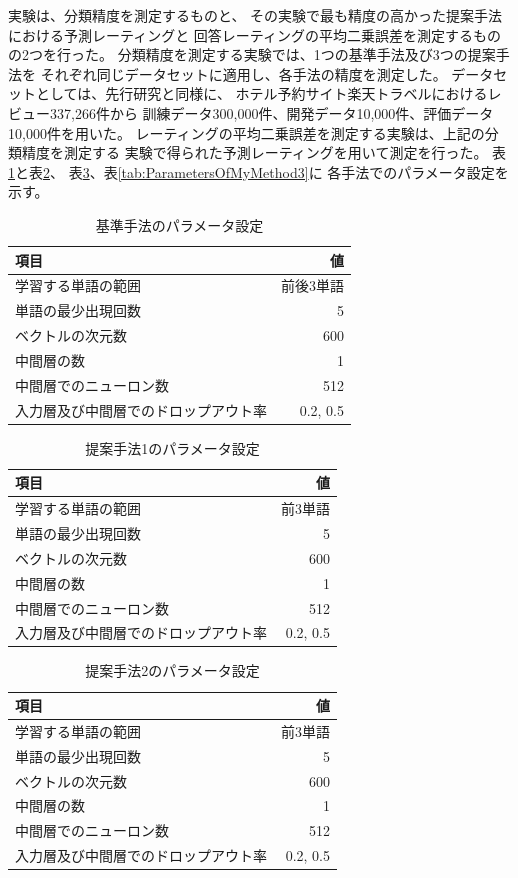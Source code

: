 \documentclass[twocolumn,a4paper]{ltjarticle}
\begin{document}
 実験は、分類精度を測定するものと、
その実験で最も精度の高かった提案手法における予測レーティングと
回答レーティングの平均二乗誤差を測定するものの2つを行った。
 分類精度を測定する実験では、1つの基準手法及び3つの提案手法を
それぞれ同じデータセットに適用し、各手法の精度を測定した。
データセットとしては、先行研究\cite{fujitani15}と同様に、
ホテル予約サイト楽天トラベルにおけるレビュー337,266件から
訓練データ300,000件、開発データ10,000件、評価データ10,000件を用いた。
 レーティングの平均二乗誤差を測定する実験は、上記の分類精度を測定する
実験で得られた予測レーティングを用いて測定を行った。
 表\ref{tab:ParametersOfBaselineMethod}と表\ref{tab:ParametersOfMyMethod1}、
表\ref{tab:ParametersOfMyMethod2}、表\ref{tab:ParametersOfMyMethod3}に
各手法でのパラメータ設定を示す。

\begin{table}
  \caption{基準手法のパラメータ設定}
  \begin{tabular}{l | r}\label{tab:ParametersOfBaselineMethod}
    項目 & 値 \\
    \hline
    学習する単語の範囲 & 前後3単語 \\
    単語の最少出現回数 & 5 \\
    ベクトルの次元数 & 600 \\
    中間層の数 & 1 \\
    中間層でのニューロン数 & 512 \\
    入力層及び中間層でのドロップアウト率 & 0.2, 0.5 \\
  \end{tabular}
\end{table}

\begin{table}
  \caption{提案手法1のパラメータ設定}
  \begin{tabular}{l | r}\label{tab:ParametersOfMyMethod1}
    項目 & 値 \\
    \hline
    学習する単語の範囲 & 前3単語 \\
    単語の最少出現回数 & 5 \\
    ベクトルの次元数 & 600 \\
    中間層の数 & 1 \\
    中間層でのニューロン数 & 512 \\
    入力層及び中間層でのドロップアウト率 & 0.2, 0.5 \\
  \end{tabular}
\end{table}

\begin{table}
  \caption{提案手法2のパラメータ設定}
  \begin{tabular}{l | r}\label{tab:ParametersOfMyMethod2}
    項目 & 値 \\
    \hline
    学習する単語の範囲 & 前3単語 \\
    単語の最少出現回数 & 5 \\
    ベクトルの次元数 & 600 \\
    中間層の数 & 1 \\
    中間層でのニューロン数 & 512 \\
    入力層及び中間層でのドロップアウト率 & 0.2, 0.5 \\
  \end{tabular}
\end{table}
\end{document}
